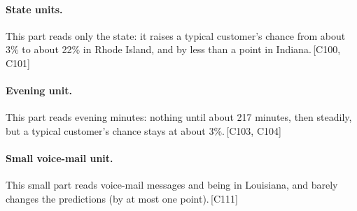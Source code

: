 \documentclass[a4paper,10pt]{article}
\newif\ifreviewmarks
\newcommand{\reviewrule}{\noindent{\color{BrickRed}\rule{\linewidth}{0.8pt}}}
\newenvironment{drafted}[1][]{%
  \ifreviewmarks\par\addvspace{\medskipamount}\reviewrule\par\nopagebreak
  \noindent{\color{BrickRed}\sffamily\footnotesize\textbf{Thesis Draft}\quad #1\hfill review}\par\nopagebreak\smallskip\fi}{%
  \ifreviewmarks\par\smallskip\noindent{\color{BrickRed}\sffamily\footnotesize end of thesis draft}\par\nopagebreak\reviewrule\par\medskip\fi}
\begin{document}
\begin{drafted}[plain-language layer: churn100-s4-c2]
\paragraph{State units.} This part reads only the state: it raises a typical customer's chance from about 3\% to about 22\% in Rhode Island, and by less than a point in Indiana.\,{\scriptsize\textcolor{NavyBlue}{[C100, C101]}}
\paragraph{Evening unit.} This part reads evening minutes: nothing until about 217 minutes, then steadily, but a typical customer's chance stays at about 3\%.\,{\scriptsize\textcolor{NavyBlue}{[C103, C104]}}
\paragraph{Small voice-mail unit.} This small part reads voice-mail messages and being in Louisiana, and barely changes the predictions (by at most one point).\,{\scriptsize\textcolor{NavyBlue}{[C111]}}

\end{drafted}
\end{document}
